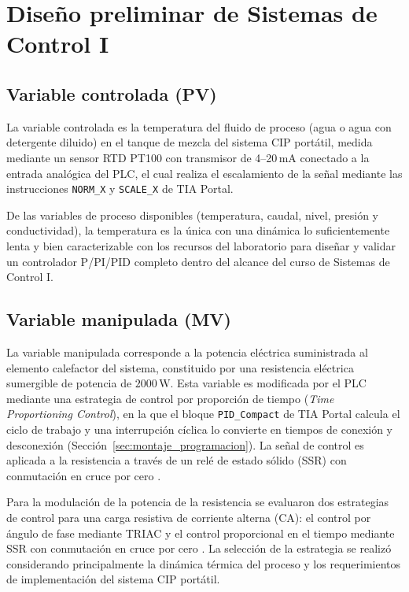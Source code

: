 \section{Diseño preliminar de Sistemas de Control I}\label{sec:control}

\subsection{Variable controlada (PV)}\label{sec:pv}

La variable controlada es la temperatura del fluido de proceso (agua o agua con detergente diluido) en el tanque de mezcla del sistema CIP portátil, medida mediante un sensor RTD PT100 con transmisor de 4--20\,mA conectado a la entrada analógica del PLC, el cual realiza el escalamiento de la señal mediante las instrucciones \texttt{NORM\_X} y \texttt{SCALE\_X} de TIA Portal.

De las variables de proceso disponibles (temperatura, caudal, nivel, presión y conductividad), la temperatura es la única con una dinámica lo suficientemente lenta y bien caracterizable con los recursos del laboratorio para diseñar y validar un controlador P/PI/PID completo dentro del alcance del curso de Sistemas de Control I.

\subsection{Variable manipulada (MV)}\label{sec:mv}

La variable manipulada corresponde a la potencia eléctrica suministrada al elemento calefactor del sistema, constituido por una resistencia eléctrica sumergible de potencia de $2000\,\mathrm{W}$. Esta variable es modificada por el PLC mediante una estrategia de control por proporción de tiempo (\textit{Time Proportioning Control}), en la que el bloque \texttt{PID\_Compact} de TIA Portal \cite{siemens2021pid} calcula el ciclo de trabajo y una interrupción cíclica lo convierte en tiempos de conexión y desconexión (Sección~\ref{sec:montaje_programacion}). La señal de control es aplicada a la resistencia a través de un relé de estado sólido (SSR) con conmutación en cruce por cero \cite{rashid2014power}.

Para la modulación de la potencia de la resistencia se evaluaron dos estrategias de control para una carga resistiva de corriente alterna (CA): el control por ángulo de fase mediante TRIAC y el control proporcional en el tiempo mediante SSR con conmutación en cruce por cero \cite{mohan2007power}. La selección de la estrategia se realizó considerando principalmente la dinámica térmica del proceso y los requerimientos de implementación del sistema CIP portátil.

